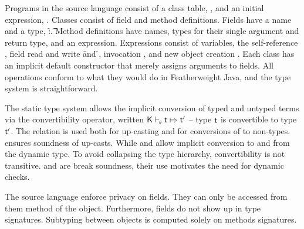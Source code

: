 \documentclass[sigconf]{acmart}
\begin{document}
Programs in the source language consist of a class table, \K, and an initial
expression, \e. Classes consist of field and method definitions. Fields have
a name and a type, \f:\t. Method definitions have names, types for their
single argument and return type, and an expression. Expressions consist of
variables, the self-reference \this, field read and write \FRead\f and
\FWrite\f\e, invocation \Call\e\m\e, and new object creation
\New{}. Each class has an implicit default constructor that merely
assigns arguments to fields. All operations conform to what they would do in
Featherweight Java, and the type system is straightforward.

The static type system allows the implicit conversion of typed and untyped
terms via the convertibility operator, written $\ConvertE\K s\t\tp$ -- type
$\t$ is convertible to type $\tp$.  The relation is used both for up-casting
and for conversions of \any to non-\any types.   ensures
soundness of up-casts. While  and  allow implicit
conversion to and from the dynamic type.  To avoid collapsing the type
hierarchy, convertibility is not transitive.  and
 are break soundness, their use motivates the need for dynamic
checks. 

The source language enforce privacy on fields. They can only be accessed
from them method of the object. Furthermore, fields do not show up in type
signatures. Subtyping between objects is computed solely on methods
signatures.
\end{document}
